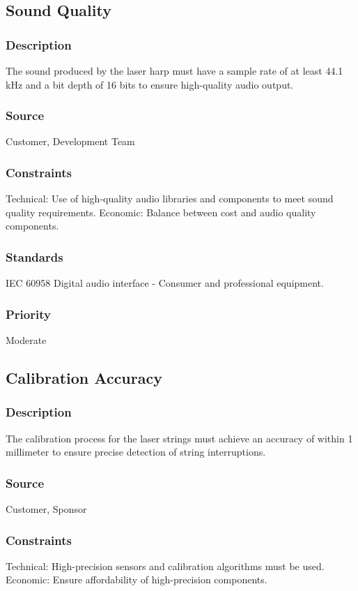 \subsection{Sound Quality}
\subsubsection{Description}
The sound produced by the laser harp must have a sample rate of at least 44.1 kHz and a bit depth of 16 bits to ensure high-quality audio output.
\subsubsection{Source}
Customer, Development Team
\subsubsection{Constraints}
Technical: Use of high-quality audio libraries and components to meet sound quality requirements.
Economic: Balance between cost and audio quality components.
\subsubsection{Standards}
IEC 60958 Digital audio interface - Consumer and professional equipment.
\subsubsection{Priority}
Moderate


\subsection{Calibration Accuracy}
\subsubsection{Description}
The calibration process for the laser strings must achieve an accuracy of within 1 millimeter to ensure precise detection of string interruptions.
\subsubsection{Source}
Customer, Sponsor
\subsubsection{Constraints}
Technical: High-precision sensors and calibration algorithms must be used.
Economic: Ensure affordability of high-precision components.
